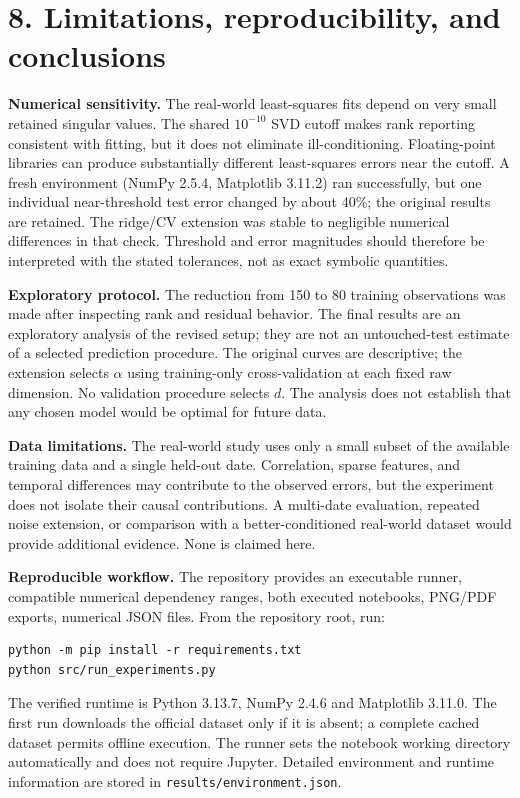 \documentclass[10pt,a4paper]{article}
\newcommand{\pageheading}[1]{\section*{#1}}
\begin{document}
\newpage
\pageheading{8. Limitations, reproducibility, and conclusions}
\textbf{Numerical sensitivity.} The real-world least-squares fits depend on very small retained singular values. The shared $10^{-10}$ SVD cutoff makes rank reporting consistent with fitting, but it does not eliminate ill-conditioning. Floating-point libraries can produce substantially different least-squares errors near the cutoff. A fresh environment (NumPy 2.5.4, Matplotlib 3.11.2) ran successfully, but one individual near-threshold test error changed by about 40\%; the original results are retained. The ridge/CV extension was stable to negligible numerical differences in that check. Threshold and error magnitudes should therefore be interpreted with the stated tolerances, not as exact symbolic quantities.

\textbf{Exploratory protocol.} The reduction from 150 to 80 training observations was made after inspecting rank and residual behavior. The final results are an exploratory analysis of the revised setup; they are not an untouched-test estimate of a selected prediction procedure. The original curves are descriptive; the extension selects $\alpha$ using training-only cross-validation at each fixed raw dimension. No validation procedure selects $d$. The analysis does not establish that any chosen model would be optimal for future data.

\textbf{Data limitations.} The real-world study uses only a small subset of the available training data and a single held-out date. Correlation, sparse features, and temporal differences may contribute to the observed errors, but the experiment does not isolate their causal contributions. A multi-date evaluation, repeated noise extension, or comparison with a better-conditioned real-world dataset would provide additional evidence. None is claimed here.

\textbf{Reproducible workflow.} The repository provides an executable runner, compatible numerical dependency ranges, both executed notebooks, PNG/PDF exports, numerical JSON files. From the repository root, run:
\begin{verbatim}
python -m pip install -r requirements.txt
python src/run_experiments.py
\end{verbatim}
The verified runtime is Python 3.13.7, NumPy 2.4.6 and Matplotlib 3.11.0. The first run downloads the official dataset only if it is absent; a complete cached dataset permits offline execution. The runner sets the notebook working directory automatically and does not require Jupyter. Detailed environment and runtime information are stored in \texttt{results/environment.json}.
\end{document}
